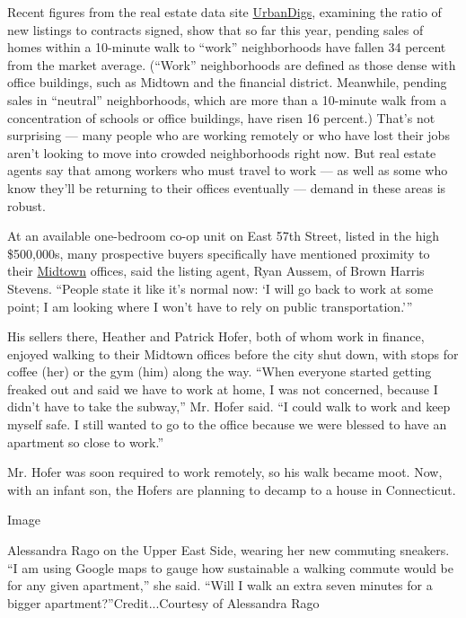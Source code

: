Recent figures from the real estate data site
\href{http://urbandigs.com/}{UrbanDigs}, examining the ratio of new
listings to contracts signed, show that so far this year, pending sales
of homes within a 10-minute walk to ``work'' neighborhoods have fallen
34 percent from the market average. (``Work'' neighborhoods are defined
as those dense with office buildings, such as Midtown and the financial
district. Meanwhile, pending sales in ``neutral'' neighborhoods, which
are more than a 10-minute walk from a concentration of schools or office
buildings, have risen 16 percent.) That's not surprising --- many people
who are working remotely or who have lost their jobs aren't looking to
move into crowded neighborhoods right now. But real estate agents say
that among workers who must travel to work --- as well as some who know
they'll be returning to their offices eventually --- demand in these
areas is robust.

At an available one-bedroom co-op unit on East 57th Street, listed in
the high \$500,000s, many prospective buyers specifically have mentioned
proximity to their
\href{https://www.nytimes3xbfgragh.onion/2014/06/08/realestate/condos-and-restaurants-make-midtown-east-more-desirable.html}{Midtown}
offices, said the listing agent, Ryan Aussem, of Brown Harris Stevens.
``People state it like it's normal now: `I will go back to work at some
point; I am looking where I won't have to rely on public
transportation.'''

His sellers there, Heather and Patrick Hofer, both of whom work in
finance, enjoyed walking to their Midtown offices before the city shut
down, with stops for coffee (her) or the gym (him) along the way. ``When
everyone started getting freaked out and said we have to work at home, I
was not concerned, because I didn't have to take the subway,'' Mr. Hofer
said. ``I could walk to work and keep myself safe. I still wanted to go
to the office because we were blessed to have an apartment so close to
work.''

Mr. Hofer was soon required to work remotely, so his walk became moot.
Now, with an infant son, the Hofers are planning to decamp to a house in
Connecticut.

Image

Alessandra Rago on the Upper East Side, wearing her new commuting
sneakers. ``I am using Google maps to gauge how sustainable a walking
commute would be for any given apartment,'' she said. ``Will I walk an
extra seven minutes for a bigger apartment?''Credit...Courtesy of
Alessandra Rago

